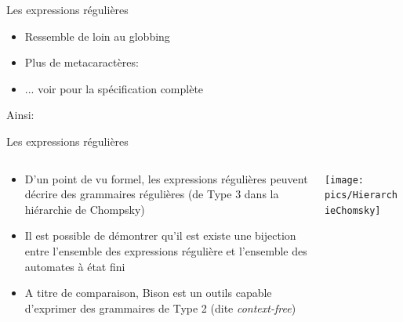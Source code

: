 \begin{frame}[fragile=singleslide]{Les expressions régulières}
  \begin{itemize}
  \item Ressemble de loin au globbing
  \item Plus de metacaractères:
  \item ... voir  pour la spécification complète
  \end{itemize}
  Ainsi:
\end{frame}

\begin{frame}[fragile=singleslide]{Les expressions régulières}
  \begin{columns}
    \begin{column}{6cm}
      \begin{itemize}
      \item D'un  point de vu  formel, les expressions  régulières peuvent
        décrire des grammaires régulières (de Type 3 dans la hiérarchie de
        Chompsky)
      \item Il  est possible de  démontrer qu'il est existe  une bijection
        entre  l'ensemble  des  expressions  régulière et  l'ensemble  des
        automates à état fini
      \item A titre de comparaison, Bison est un outils capable d'exprimer
        des grammaires de Type 2 (dite \emph{context-free})
      \end{itemize}
    \end{column}
    \begin{column}{4cm}
      \texttt{[image: pics/HierarchieChomsky]}
    \end{column}
  \end{columns}
\end{frame}

